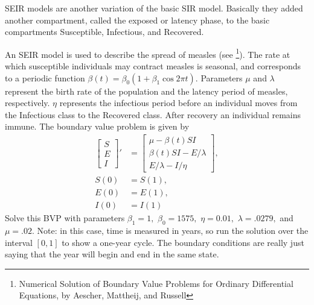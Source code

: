 \begin{problem}
SEIR models are another variation of the basic SIR model.
Basically they added another compartment, called the exposed or latency phase, to the basic compartments Susceptible, Infectious, and Recovered.

An SEIR model is used to describe the spread of measles (see \footnote{Numerical Solution of Boundary Value Problems for Ordinary Differential Equations, by Aescher, Mattheij, and Russell}).
The rate at which susceptible individuals may contract measles is seasonal, and corresponds to a periodic function $\beta(t) = \beta_0(1 + \beta_1 \cos{2\pi t})$.
Parameters $\mu$ and $\lambda$ represent the birth rate of the population and the latency period of measles, respectively.
$\eta$ represents the infectious period before an individual moves from the Infectious class to the Recovered class.
After recovery an individual remains immune.
The boundary value problem is given by
\begin{align*}
\left[\begin{array}{c}S \\ E \\ I\end{array}\right]' &= \left[\begin{array}{c}\mu - \beta(t) S I \\\beta(t) SI - E/\lambda \\E/\lambda - I/\eta\end{array}\right],\\
S(0) &= S(1),\\
E(0) &= E(1),\\
I(0) &= I(1)
\end{align*}
Solve this BVP with parameters $\beta_1 = 1,$ $\beta_0 = 1575,$ $\eta = 0.01,$ $\lambda = .0279,$ and $\mu = .02.$
Note: in this case, time is measured in years, so run the solution over the interval $\left[0, 1\right]$ to show a one-year cycle.
The boundary conditions are really just saying that the year will begin and end in the same state.


\end{problem}
